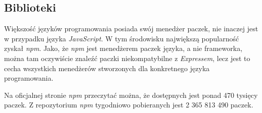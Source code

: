 \subsection{Biblioteki}
Większość języków programowania posiada swój menedżer paczek, nie inaczej jest w przypadku języka \textit{JavaScript}. W tym środowisku największą popularność zyskał \textit{npm}. Jako, że \textit{npm} jest menedżerem paczek języka, a nie frameworka, można tam oczywiście znaleźć paczki niekompatybilne z \textit{Expressem}, lecz jest to cecha wszystkich menedżerów stworzonych dla konkretnego języka programowania.

Na oficjalnej stronie \textit{npm} \cite{npm_site} przeczytać można, że dostępnych jest ponad 470 tysięcy paczek. Z repozytorium \textit{npm} tygodniowo pobieranych jest 2 365 813 490 paczek.
